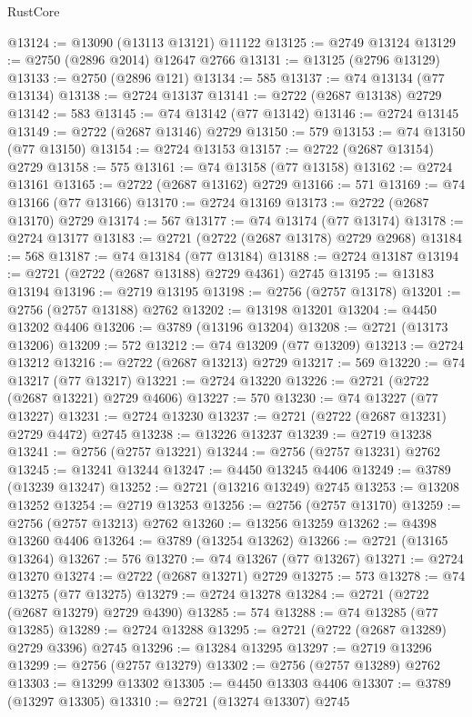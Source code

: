 \begin{lexlean}{RustCore}
\begin{coremodule}
@13124 := @13090 (@13113 @13121) @11122
@13125 := @2749 @13124
@13129 := @2750 (@2896 @2014) @12647 @2766
@13131 := @13125 (@2796 @13129)
@13133 := @2750 (@2896 @121)
@13134 := 585
@13137 := @74 @13134 (@77 @13134)
@13138 := @2724 @13137
@13141 := @2722 (@2687 @13138) @2729
@13142 := 583
@13145 := @74 @13142 (@77 @13142)
@13146 := @2724 @13145
@13149 := @2722 (@2687 @13146) @2729
@13150 := 579
@13153 := @74 @13150 (@77 @13150)
@13154 := @2724 @13153
@13157 := @2722 (@2687 @13154) @2729
@13158 := 575
@13161 := @74 @13158 (@77 @13158)
@13162 := @2724 @13161
@13165 := @2722 (@2687 @13162) @2729
@13166 := 571
@13169 := @74 @13166 (@77 @13166)
@13170 := @2724 @13169
@13173 := @2722 (@2687 @13170) @2729
@13174 := 567
@13177 := @74 @13174 (@77 @13174)
@13178 := @2724 @13177
@13183 := @2721 (@2722 (@2687 @13178) @2729 @2968)
@13184 := 568
@13187 := @74 @13184 (@77 @13184)
@13188 := @2724 @13187
@13194 := @2721 (@2722 (@2687 @13188) @2729 @4361) @2745
@13195 := @13183 @13194
@13196 := @2719 @13195
@13198 := @2756 (@2757 @13178)
@13201 := @2756 (@2757 @13188) @2762
@13202 := @13198 @13201
@13204 := @4450 @13202 @4406
@13206 := @3789 (@13196 @13204)
@13208 := @2721 (@13173 @13206)
@13209 := 572
@13212 := @74 @13209 (@77 @13209)
@13213 := @2724 @13212
@13216 := @2722 (@2687 @13213) @2729
@13217 := 569
@13220 := @74 @13217 (@77 @13217)
@13221 := @2724 @13220
@13226 := @2721 (@2722 (@2687 @13221) @2729 @4606)
@13227 := 570
@13230 := @74 @13227 (@77 @13227)
@13231 := @2724 @13230
@13237 := @2721 (@2722 (@2687 @13231) @2729 @4472) @2745
@13238 := @13226 @13237
@13239 := @2719 @13238
@13241 := @2756 (@2757 @13221)
@13244 := @2756 (@2757 @13231) @2762
@13245 := @13241 @13244
@13247 := @4450 @13245 @4406
@13249 := @3789 (@13239 @13247)
@13252 := @2721 (@13216 @13249) @2745
@13253 := @13208 @13252
@13254 := @2719 @13253
@13256 := @2756 (@2757 @13170)
@13259 := @2756 (@2757 @13213) @2762
@13260 := @13256 @13259
@13262 := @4398 @13260 @4406
@13264 := @3789 (@13254 @13262)
@13266 := @2721 (@13165 @13264)
@13267 := 576
@13270 := @74 @13267 (@77 @13267)
@13271 := @2724 @13270
@13274 := @2722 (@2687 @13271) @2729
@13275 := 573
@13278 := @74 @13275 (@77 @13275)
@13279 := @2724 @13278
@13284 := @2721 (@2722 (@2687 @13279) @2729 @4390)
@13285 := 574
@13288 := @74 @13285 (@77 @13285)
@13289 := @2724 @13288
@13295 := @2721 (@2722 (@2687 @13289) @2729 @3396) @2745
@13296 := @13284 @13295
@13297 := @2719 @13296
@13299 := @2756 (@2757 @13279)
@13302 := @2756 (@2757 @13289) @2762
@13303 := @13299 @13302
@13305 := @4450 @13303 @4406
@13307 := @3789 (@13297 @13305)
@13310 := @2721 (@13274 @13307) @2745

\end{coremodule}
\end{lexlean}
